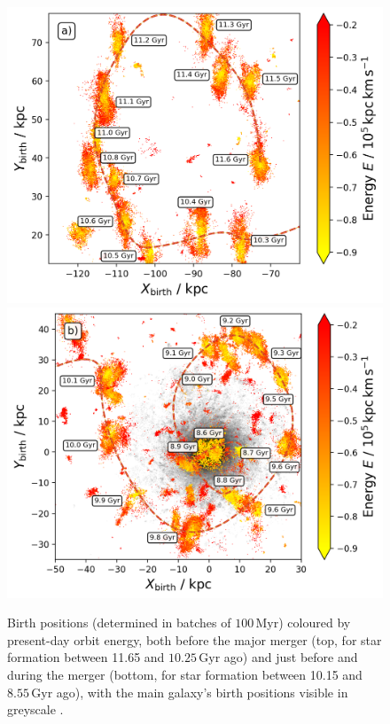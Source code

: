 \documentclass[fleqn,usenatbib]{mnras}
\begin{document}
\begin{figure}
    \centering
    \includegraphics[width=\columnwidth]{figures/fellowship.png}
    \includegraphics[width=\columnwidth]{figures/mount_doom.png}
    \caption{Birth positions (determined in batches of $100\,\mathrm{Myr}$) coloured by present-day orbit energy, both before the major merger (top, for star formation between 11.65 and $10.25\,\mathrm{Gyr}$ ago) and just before and during the merger (bottom, for star formation between 10.15 and $8.55\,\mathrm{Gyr}$ ago), with the main galaxy's birth positions visible in greyscale \href{https://github.com/svenbuder/golden_thread_I/tree/main/figures}{\faGithub}.}
    \label{fig:fellowship_and_mount_doom}
\end{figure}
\end{document}
